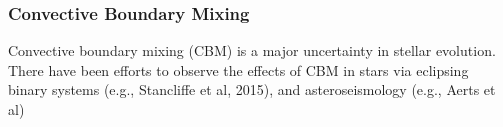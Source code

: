 {\color{purple}
\subsubsection{Convective Boundary Mixing}
}

Convective boundary mixing (CBM) is a major uncertainty in stellar evolution. There have been efforts to observe the effects of CBM in stars via eclipsing binary systems (e.g., Stancliffe et al, 2015), and asteroseismology (e.g., Aerts et al)

